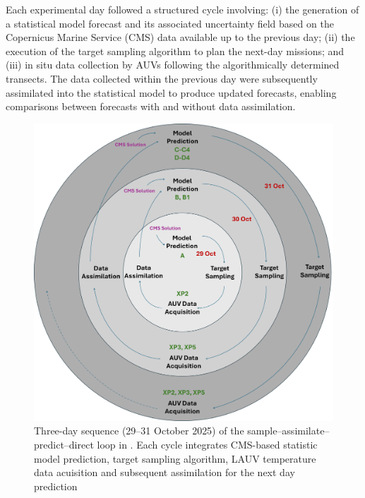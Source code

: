 
Each experimental day followed a structured cycle involving: (i) the
generation of a statistical model forecast and its associated
uncertainty field based on the Copernicus Marine Service (CMS)
\cite{sotillo2021} data available up to the previous day; (ii) the
execution of the target sampling algorithm to plan the next-day
missions; and (iii) in situ data collection by AUVs following the
algorithmically determined transects. The data collected within the
previous day were subsequently assimilated into the statistical model
to produce updated forecasts, enabling comparisons between forecasts
with and without data assimilation.


\begin{figure}
    \centering
    \includegraphics[scale=0.12]{fig/scheme.png}
    \caption{Three-day sequence (29–31 October 2025) of the sample–assimilate–predict–direct loop in \proj. Each cycle integrates CMS-based statistic model prediction, target sampling algorithm, LAUV temperature data acuisition and subsequent assimilation for the next day prediction}
    \label{fig:scheme}
\end{figure}

